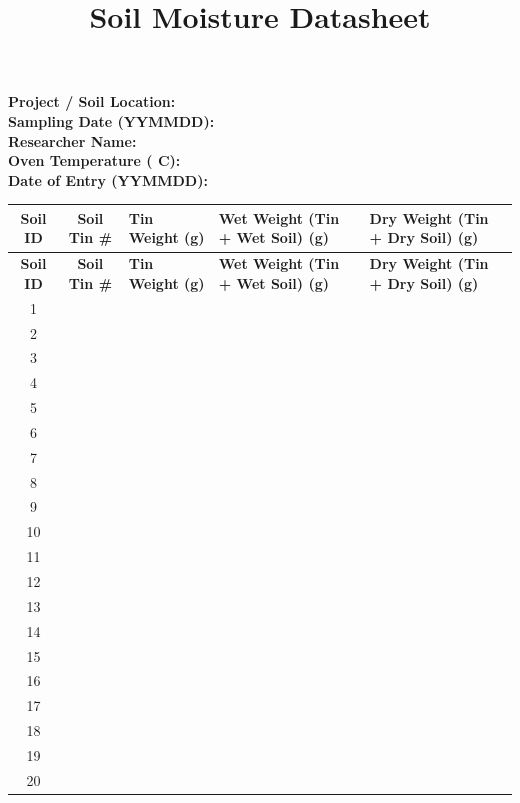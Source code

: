 \documentclass{article}\usepackage[]{graphicx}\usepackage[]{xcolor}
\title{Soil Moisture Datasheet}
\date{}
\begin{document}
\maketitle

\vspace{-2em}

\noindent
\textbf{Project / Soil Location:} \hrulefill\\[0.5em]
\textbf{Sampling Date (YYMMDD):} \hrulefill\\[0.5em]
\textbf{Researcher Name:} \hrulefill\\[0.5em]
\textbf{Oven Temperature ( C):} \hrulefill\\[0.5em]
\textbf{Date of Entry (YYMMDD):} \hrulefill\\[0.5em]

\vspace{1em}

\begin{longtable}{|c|c|p{3cm}|p{3cm}|p{3cm}|}
\hline
\textbf{Soil ID} & \textbf{Soil Tin \#} & \textbf{Tin Weight (g)} & \textbf{Wet Weight (Tin + Wet Soil) (g)} & \textbf{Dry Weight (Tin + Dry Soil) (g)} \\
\hline
\endfirsthead
\hline
\textbf{Soil ID} & \textbf{Soil Tin \#} & \textbf{Tin Weight (g)} & \textbf{Wet Weight (Tin + Wet Soil) (g)} & \textbf{Dry Weight (Tin + Dry Soil) (g)} \\
\hline
\endhead
1  &       &       &       &       \\ \hline 
2  &       &       &       &       \\ \hline
3  &       &       &       &       \\ \hline
4  &       &       &       &       \\ \hline
5  &       &       &       &       \\ \hline
6  &       &       &       &       \\ \hline
7  &       &       &       &       \\ \hline
8  &       &       &       &       \\ \hline
9  &       &       &       &       \\ \hline
10 &       &       &       &       \\ \hline
11 &       &       &       &       \\ \hline
12 &       &       &       &       \\ \hline
13 &       &       &       &       \\ \hline
14 &       &       &       &       \\ \hline
15 &       &       &       &       \\ \hline
16 &       &       &       &       \\ \hline
17 &       &       &       &       \\ \hline
18 &       &       &       &       \\ \hline
19 &       &       &       &       \\ \hline
20 &       &       &       &       \\ \hline
\end{longtable}
\end{document}
